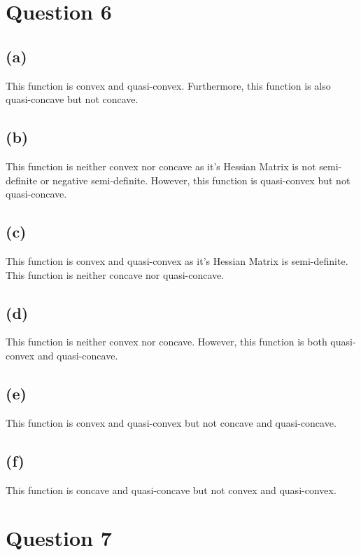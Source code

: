 \documentclass[10pt,a4paper]{article}
\begin{document}
\section*{Question 6}
\subsection*{(a)}
This function is convex and quasi-convex. Furthermore, this function is also quasi-concave but not concave.
\subsection*{(b)}
This function is neither convex nor concave as it's Hessian Matrix is not semi-definite or negative semi-definite. However, this function is quasi-convex but not quasi-concave.
\subsection*{(c)}
This function is convex and quasi-convex as it's Hessian Matrix is semi-definite. This function is neither concave nor quasi-concave.
\subsection*{(d)}
This function is neither convex nor concave. However, this function is both quasi-convex and quasi-concave.
\subsection*{(e)}
This function is convex and quasi-convex but not concave and quasi-concave.
\subsection*{(f)}
This function is concave and quasi-concave but not convex and quasi-convex.

\section*{Question 7}
\end{document}
